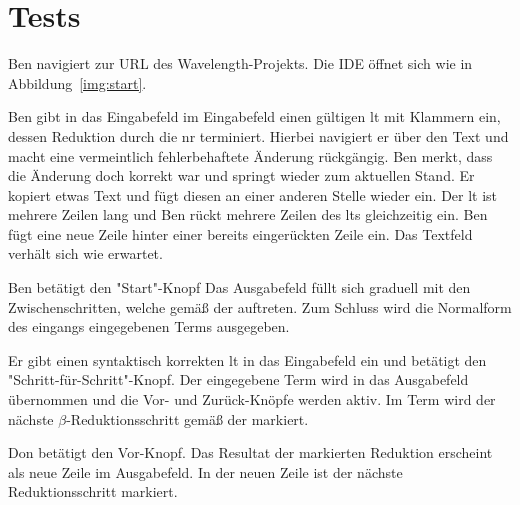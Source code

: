 \documentclass[parskip=full,11pt,twoside]{scrartcl}
\begin{document}
\section{Tests}


{Ben navigiert zur URL des Wavelength-Projekts.}
{Die IDE öffnet sich wie in Abbildung~\ref{img:start}.}

{Ben gibt in das Eingabefeld im Eingabefeld einen gültigen \gls{lt} mit Klammern ein,
dessen Reduktion durch die \gls{nr} terminiert.
Hierbei navigiert er über den Text und macht eine vermeintlich fehlerbehaftete Änderung rückgängig. 
Ben merkt, dass die Änderung doch korrekt war und springt wieder zum aktuellen Stand. Er kopiert etwas Text und fügt diesen an einer anderen Stelle wieder ein.
Der \gls{lt} ist mehrere Zeilen lang und Ben rückt mehrere Zeilen des \gls{lt}s gleichzeitig ein.
Ben fügt eine neue Zeile hinter einer bereits eingerückten Zeile ein.}
{Das Textfeld verhält sich wie erwartet.}

{Ben betätigt den "Start"-Knopf}
{Das Ausgabefeld füllt sich graduell mit den Zwischenschritten, welche gemäß der  auftreten.
Zum Schluss wird die Normalform des eingangs eingegebenen Terms ausgegeben.}


{Er gibt einen syntaktisch korrekten \gls{lt} in das Eingabefeld ein und betätigt
den "Schritt-für-Schritt"-Knopf.}
{Der eingegebene Term wird in das Ausgabefeld übernommen und die Vor- und
Zurück-Knöpfe werden aktiv. Im Term wird der nächste $\beta$-Reduktionsschritt
gemäß der  markiert.}

{Don betätigt den Vor-Knopf.}
{Das Resultat der markierten Reduktion erscheint als neue Zeile im Ausgabefeld.
In der neuen Zeile ist der nächste Reduktionsschritt markiert.}
\end{document}
